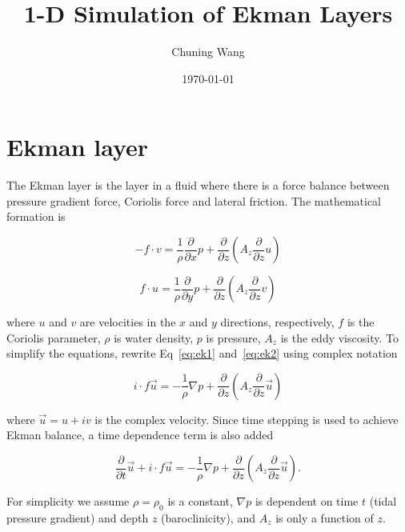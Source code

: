 \documentclass{article}
\title{1-D Simulation of Ekman Layers}
\author{Chuning Wang}
\date{\today}
\begin{document}
\maketitle



\section{Ekman layer}
The Ekman layer is the layer in a fluid where there is a force balance between pressure gradient force, Coriolis force and lateral friction. The mathematical formation is

\begin{equation}
-f\cdot v=\frac{1}{\rho}\frac{\partial}{\partial x}p+\frac{\partial}{\partial z}(A_z\frac{\partial}{\partial z}u)
\label{eq:ek1}
\end{equation}

\begin{equation}
f\cdot u=\frac{1}{\rho}\frac{\partial}{\partial y}p+\frac{\partial}{\partial z}(A_z\frac{\partial}{\partial z}v)
\label{eq:ek2}
\end{equation}

where $u$ and $v$ are velocities in the $x$ and $y$ directions, respectively, $f$ is the Coriolis parameter, $\rho$ is water density, $p$ is pressure, $A_z$ is the eddy viscosity. To simplify the equations, rewrite Eq~\ref{eq:ek1} and~\ref{eq:ek2} using complex notation

\begin{equation}
i\cdot f\vec{u}=-\frac{1}{\rho}\nabla p+\frac{\partial}{\partial z}(A_z\frac{\partial}{\partial z}\vec{u})
\end{equation}

where $\vec{u}=u+iv$ is the complex velocity. Since time stepping is used to achieve Ekman balance, a time dependence term is also added

\begin{equation}
\frac{\partial}{\partial t}\vec{u}+i\cdot f\vec{u}=-\frac{1}{\rho}\nabla p+\frac{\partial}{\partial z}(A_z\frac{\partial}{\partial z}\vec{u}).
\end{equation}

For simplicity we assume $\rho=\rho_0$ is a constant, $\nabla p$ is dependent on time $t$ (tidal pressure gradient) and depth $z$ (baroclinicity), and $A_z$ is only a function of $z$.\\
\end{document}
